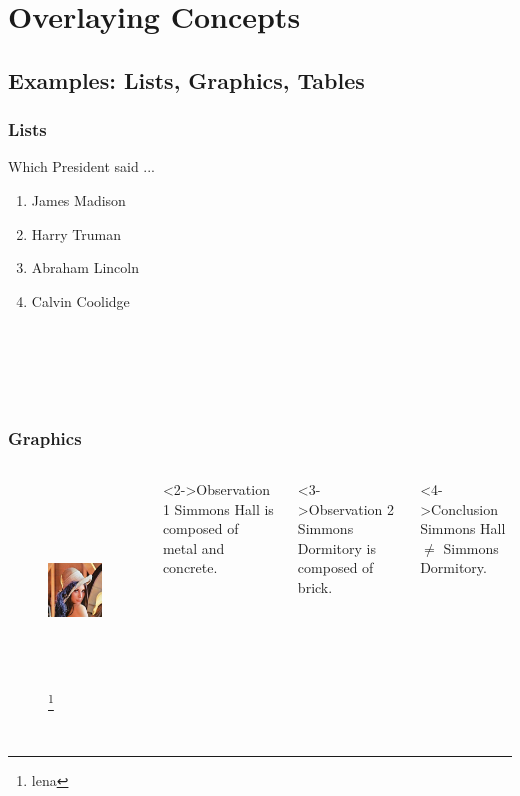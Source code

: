 \documentclass[pdf]{beamer}
\begin{document}
\section{Overlaying Concepts}


\subsection[Examples]{Examples: Lists, Graphics, Tables}
\begin{frame}
\frametitle{Lists}
Which President said ...
\begin{enumerate}[A]
\item<2-5>James Madison
\item<3-5>Harry Truman
\item<4->  Abraham Lincoln      %
\item<5-5> Calvin Coolidge
\end{enumerate}
\\                        %
\\   %
\\
\\
\end{frame}


\begin{frame}
\frametitle{Graphics}
\begin{columns}
\begin{figure}[ht]
\centering
\includegraphics[height=2in]{lena}
\footnote{lena}
\end{figure}
\begin{block}<2->{Observation 1}        %
Simmons Hall is composed of metal and concrete.
\end{block}
\begin{block}<3->{Observation 2}
Simmons Dormitory is composed of brick.
\end{block}
\begin{block}<4->{Conclusion}
Simmons Hall $ \not = $ Simmons Dormitory.
\end{block}
\end{columns}
\end{frame}
\end{document}
